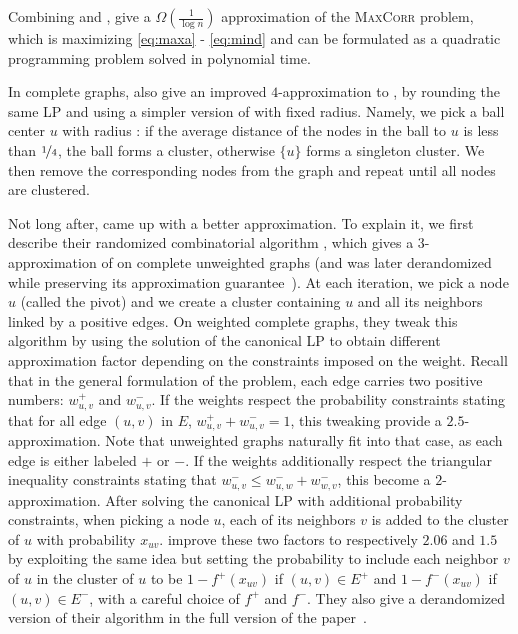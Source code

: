 Combining \mind{} and \maxa{}, \textcite[Section 4]{Charikar2004} give a $\Omega(\frac{1}{\log n})$
approximation of the \textsc{MaxCorr} problem, which is maximizing \eqref{eq:maxa} - \eqref{eq:mind}
and can be formulated as a quadratic programming problem solved in polynomial time.

In complete graphs, \textcite[Section 3]{Charikar2003} also give an improved $4$-approximation to
\mind{}, by rounding the same LP and using a simpler version of \regionGrow{} with fixed radius.
Namely, we pick a ball center $u$ \uar{} with radius \shalf{}: if the average distance of the nodes
in the ball to $u$ is less than $\nicefrac{1}{4}$, the ball forms a cluster, otherwise $\{u\}$ forms
a singleton cluster. We then remove the corresponding nodes from the graph and repeat until all
nodes are clustered.

Not long after, \textcite{CCPivotConf05} came up with a better approximation. To explain it, we
first describe their randomized combinatorial algorithm \ccpivot{}, which gives a $3$-approximation
of \mind{} on complete unweighted graphs (and was later derandomized while preserving its
approximation guarantee~\autocite{derandomCCPivot08}). At each iteration, we pick a node $u$ \uar{}
(called the pivot) and we create a cluster containing $u$ and all its neighbors
linked by a positive edges. On weighted complete graphs, they tweak this algorithm by using the
solution of the canonical LP to obtain different approximation factor depending on the
constraints imposed on the weight. Recall that in the general formulation of the problem, each
edge carries two positive numbers: $w_{u,v}^+$ and $w_{u,v}^-$. If the weights respect the
probability constraints stating that for all edge $(u,v)$ in $E$, $w_{u,v}^+ + w_{u,v}^- = 1$, this
tweaking provide a $2.5$-approximation. Note that unweighted graphs naturally fit into that case, as
each edge is either labeled $+$ or $-$. If the weights
additionally respect the triangular inequality constraints stating that $w_{u,v}^- \leq w_{u,w}^- +
w_{w,v}^-$, this become a $2$-approximation. After solving the canonical LP with additional
probability constraints, when picking a node $u$, each of its neighbors $v$ is added to the cluster
of $u$ with probability $x_{uv}$. \Textcite{Chawla2014} improve these two factors to respectively
$2.06$ and $1.5$ by exploiting the same idea but setting the probability to include each neighbor
$v$ of $u$ in the cluster of $u$ to be $1-f^+(x_{uv})$ if $(u,v)\in E^+$ and $1-f^-(x_{uv})$ if
$(u,v)\in E^-$, with a careful choice of $f^+$ and $f^-$. They also give a derandomized version of
their algorithm in the full version of the paper~\autocite[Theorem 23]{ChawlaArxiv14}.

